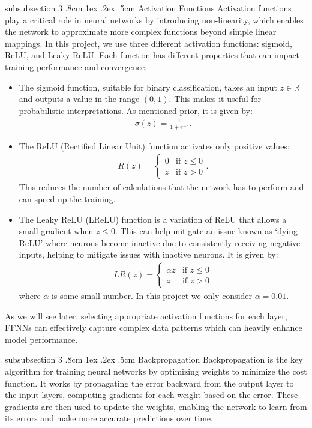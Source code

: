 \documentclass[%
reprint,s
amsmath,amssymb,
aps,
]{revtex4-2}
\makeatletter
\renewcommand{\subsubsection}{%
	\@startsection
	{subsubsection}%
	{3}%
	{\z@}%
	{.8cm \@plus1ex \@minus .2ex}%
	{.5cm}%
	{\normalfont\small\centering}%
}
\makeatother
\begin{document}
\subsubsection{Activation Functions}
Activation functions play a critical role in neural networks by introducing non-linearity, which enables the network to approximate more complex functions beyond simple linear mappings. In this project, we use three different activation functions: sigmoid, ReLU, and Leaky ReLU. Each function has different properties that can impact training performance and convergence.
\begin{itemize}
	\item The sigmoid function, suitable for binary classification, takes an input $z\in\mathbb{R}$ and outputs a value in the range $(0,1)$. This makes it useful for probabilistic interpretations. As mentioned prior, it is given by:
	\begin{align} 
		\sigma(z)=\frac{1}{1+e^{-z}}.
	\end{align}
	\item The ReLU (Rectified Linear Unit) function activates only positive values: 
	\begin{align} 
		R(z)=
		\begin{cases}
			0 & \text{if }z\leq0\\z&\text{if }z>0
		\end{cases}.
	\end{align}
	This reduces the number of calculations that the network has to perform and can speed up the training.
	\item The Leaky ReLU (LReLU) function is a variation of ReLU that allows a small gradient when $z\leq0$. This can help mitigate an issue known as `dying ReLU' where neurons become inactive due to consistently receiving negative inputs, helping to mitigate issues with inactive neurons. It is given by:
	\begin{align} 
		LR(z)=
		\begin{cases} 
			\alpha z&\text{if }z\leq0\\z&\text{if }z> 0 
		\end{cases} 
	\end{align}
	where $\alpha$ is some small number. In this project we only consider $\alpha=0.01$.
\end{itemize}
As we will see later, selecting appropriate activation functions for each layer, FFNNs can effectively capture complex data patterns which can heavily enhance model performance.

\subsubsection{Backpropagation}
Backpropagation is the key algorithm for training neural networks by optimizing weights to minimize the cost function. It works by propagating the error backward from the output layer to the input layers, computing gradients for each weight based on the error. These gradients are then used to update the weights, enabling the network to learn from its errors and make more accurate predictions over time.
\end{document}
